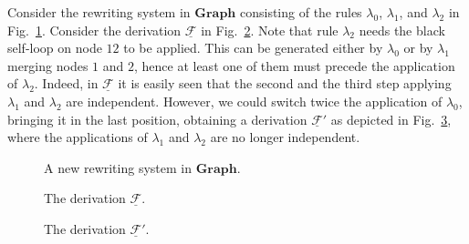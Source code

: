 \documentclass[a4paper,UKenglish,cleveref,pdftex,thm-restate,numberwithinsect]{lipics-v2021}
\newcommand{\cat}[1]{\ensuremath{\mathbf{#1}}}
\newcommand{\dder}[1]{\mathscr{#1}}
\newcommand{\der}[1]{\underline{\dder{#1}}}
\begin{document}
  
\begin{example}
  \label{ex:non-global}
  Consider the rewriting system in $\cat{Graph}$ consisting of the
  rules $\lambda_0$, $\lambda_1$, and $\lambda_2$ in
  Fig.~\ref{fi:rules-cas}.
   Consider the derivation $\der{F}$ in Fig.~\ref{fi:derF}. Note that rule
  $\lambda_2$ needs the black self-loop on node $12$ to be applied. This can be
  generated either by $\lambda_0$ or by $\lambda_1$ merging nodes $1$ and
  $2$, hence at least one of them must precede the application of
  $\lambda_2$. Indeed, in $\der{F}$ it is easily seen that the second
  and the third step applying $\lambda_1$ and $\lambda_2$ are
  independent. However, we could switch twice the application of
  $\lambda_0$, bringing it in the last position, obtaining a derivation
  $\der{F}'$ as depicted in Fig.~\ref{fi:derF1}, where the
  applications of $\lambda_1$ and $\lambda_2$ are no longer independent.
   
  \begin{figure}[t]
        
    \caption{A new rewriting system in $\cat{Graph}$.}
    \label{fi:rules-cas}
  \end{figure}

  \begin{figure}[t]
        
    \caption{The derivation $\der{F}$.} 
    \label{fi:derF}
  \end{figure}

  \begin{figure}[t]
        
    \caption{The derivation $\der{F}'$.} 
    \label{fi:derF1}
  \end{figure}
\end{example}
\end{document}
